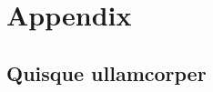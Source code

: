 \appendix


\section*{Appendix}
    \label{sec:appendix}

\renewcommand{\thesubsection}{\Alph{subsection}}
\renewcommand{\thesubsubsection}{\Alph{subsection}.\arabic{subsubsection}}


\subsection{Quisque ullamcorper}
\lipsum[4-6]